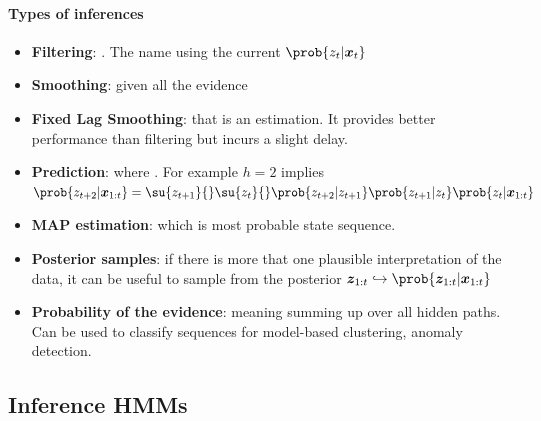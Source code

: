 \paragraph{Types of inferences}
\begin{itemize}
    \item \textbf{Filtering}:  . The name
          using the current $\prob{z_{t}|\bm{x}_{t}}$
    \item \textbf{Smoothing}:  
        given all the evidence 
    \item \textbf{Fixed Lag Smoothing}: 
        that is an  estimation.
        It provides better performance than filtering but incurs a slight delay.
    \item \textbf{Prediction}:  where
        . For example $h=2$ implies 
        $\prob{z_{t+2} |\bm{x}_{1:t}} = \su{z_{t+1}}{}\su{z_{t}}{}\prob{z_{t+2}|
        z_{t+1}} \prob{z_{t+1}|z_{t}} \prob{z_{t}|\bm{x}_{1:t}}$
    \item \textbf{MAP estimation}:  which is most probable state sequence.
    \item \textbf{Posterior samples}: if there is more that one plausible 
        interpretation of the data, it can be useful to sample from the posterior 
        $\bm{z}_{1:t} \hookrightarrow \prob{\bm{z}_{1:t}|\bm{x}_{1:t}}$
    \item \textbf{Probability of the evidence}:  meaning summing up 
        over all hidden paths. Can be used to classify sequences for model-based 
        clustering, anomaly detection.
\end{itemize}

\subsection{Inference HMMs}
